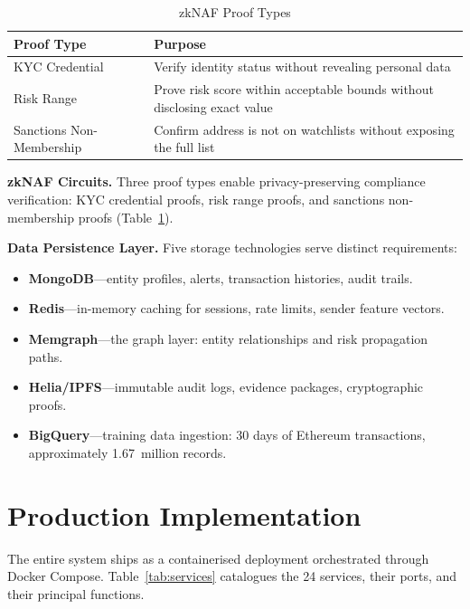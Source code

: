 \documentclass[journal]{IEEEtran}
\begin{document}
\begin{table}[!t]
\centering
\caption{zkNAF Proof Types}
\label{tab:zknaf}
\begin{tabular}{p{2.6cm}p{4.8cm}}
\toprule
\textbf{Proof Type} & \textbf{Purpose} \\
\midrule
KYC Credential & Verify identity status without revealing personal data \\
Risk Range & Prove risk score within acceptable bounds without disclosing exact value \\
Sanctions Non-Membership & Confirm address is not on watchlists without exposing the full list \\
\bottomrule
\end{tabular}
\end{table}

\textbf{zkNAF Circuits.} Three proof types enable privacy-preserving compliance verification: KYC credential proofs, risk range proofs, and sanctions non-membership proofs (Table~\ref{tab:zknaf}).

\textbf{Data Persistence Layer.} Five storage technologies serve distinct requirements:
\begin{itemize}
  \item \textbf{MongoDB}---entity profiles, alerts, transaction histories, audit trails.
  \item \textbf{Redis}---in-memory caching for sessions, rate limits, sender feature vectors.
  \item \textbf{Memgraph}---the graph layer: entity relationships and risk propagation paths.
  \item \textbf{Helia/IPFS}---immutable audit logs, evidence packages, cryptographic proofs.
  \item \textbf{BigQuery}---training data ingestion: 30 days of Ethereum transactions, approximately 1.67~million records.
\end{itemize}

\section{Production Implementation}
\label{sec:prod}

The entire system ships as a containerised deployment orchestrated through Docker Compose. Table~\ref{tab:services} catalogues the 24 services, their ports, and their principal functions.
\end{document}
